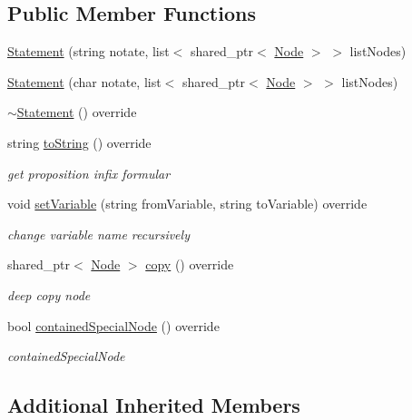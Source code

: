 \subsection*{Public Member Functions}
\begin{DoxyCompactItemize}
\item 
\hyperlink{class_statement_a63f078944310c19057bdd7c25aa1b5a3}{Statement} (string notate, list$<$ shared\+\_\+ptr$<$ \hyperlink{class_node}{Node} $>$ $>$ list\+Nodes)
\item 
\hyperlink{class_statement_a6f4d56b4180183819b76f01209acb3d1}{Statement} (char notate, list$<$ shared\+\_\+ptr$<$ \hyperlink{class_node}{Node} $>$ $>$ list\+Nodes)
\item 
\hyperlink{class_statement_a4ca9db7feff843e91b1f2200fc77a784}{$\sim$\+Statement} () override
\item 
string \hyperlink{class_statement_a0e9ec611dc39c53ed01cf0f877db9881}{to\+String} () override
\begin{DoxyCompactList}\small\item\em get proposition infix formular \end{DoxyCompactList}\item 
void \hyperlink{class_statement_a96d67118f27e64d72b189d837103a126}{set\+Variable} (string from\+Variable, string to\+Variable) override
\begin{DoxyCompactList}\small\item\em change variable name recursively \end{DoxyCompactList}\item 
shared\+\_\+ptr$<$ \hyperlink{class_node}{Node} $>$ \hyperlink{class_statement_a7d8bac78c76a6cf7265495da5b16935d}{copy} () override
\begin{DoxyCompactList}\small\item\em deep copy node \end{DoxyCompactList}\item 
bool \hyperlink{class_statement_a482a663d073d2601fa1759a5e651c240}{contained\+Special\+Node} () override
\begin{DoxyCompactList}\small\item\em contained\+Special\+Node \end{DoxyCompactList}\end{DoxyCompactItemize}
\subsection*{Additional Inherited Members}


